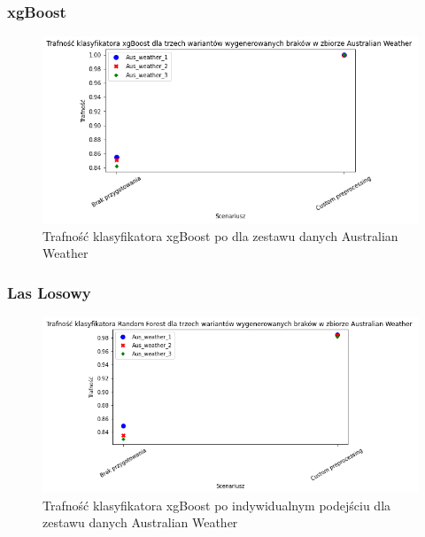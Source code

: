 \documentclass{book}
\begin{document}
\subsubsection{xgBoost} 
\begin{figure}[H]
    \centerline{\includegraphics[scale=0.5]{Aus_Weather_xgb_Custom}}
    \centering
    \caption{Trafność klasyfikatora xgBoost po  dla zestawu danych Australian Weather}
    \end{figure}

\subsubsection{Las Losowy}

\begin{figure}[H]
    \centerline{\includegraphics[scale=0.5]{Aus_Weather_rfc_Custom}}
    \centering
    \caption{Trafność klasyfikatora xgBoost po indywidualnym podejściu dla zestawu danych Australian Weather}
    \end{figure}
    
\end{document}
